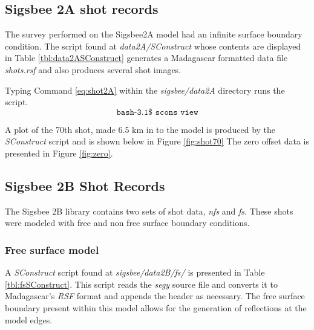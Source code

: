 \subsection{Sigsbee 2A shot records}
The survey performed on the Sigsbee2A model had an infinite surface boundary condition.  The script found at 
\emph{data2A/SConstruct} whose contents are displayed in Table \ref{tbl:data2ASConstruct} generates a Madagascar 
formatted data file \emph{shots.rsf} and also produces several shot images. 
  
{
\tiny

\normalsize
}

Typing Command \ref{eq:shot2A} within the \emph{sigsbee/data2A} directory runs the script.
\begin{equation}\label{eq:shot2A} \texttt{bash-3.1\$\ scons\ view} \end{equation}

A plot of the 70th shot, made 6.5 km in to the model is produced by the \emph{SConstruct} script and is shown below in Figure \ref{fig:shot70}  The zero offset data is presented in Figure \ref{fig:zero}.


\subsection{Sigsbee 2B Shot Records}
The Sigsbee 2B library contains two sets of shot data, \emph{nfs} and \emph{fs}.  These shots were modeled with free and non free surface 
boundary conditions.  

\subsubsection{Free surface model}  
A \emph{SConstruct} script found at \textit{sigsbee/data2B/fs/} is presented in Table \ref{tbl:fsSConstruct}.  
This script reads the \emph{segy} source file and converts it to Madagascar's \emph{RSF} format and appends the header as 
necessary.  The free surface boundary present within this model allows for the generation of reflections at the model edges.  

{
\tiny

\normalsize
}


